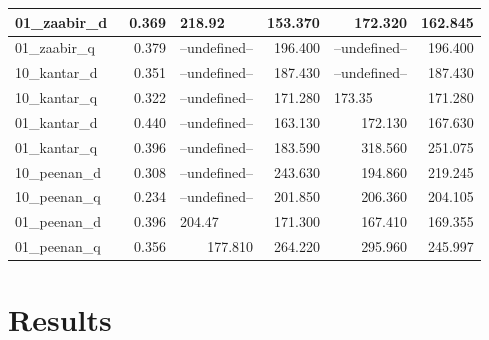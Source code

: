 \documentclass[a4paper]{article}
\begin{document}
\begin{table}[H]
\begin{tabular}{|l|r|l|r|l|r|}
\hline
01\_zaabir\_d~  & 0.369                         & 218.92                       & 153.370                            & \multicolumn{1}{r|}{172.320} & 162.845                          \\ 
\hline
01\_zaabir\_q~  & 0.379                         & --undefined--                & 196.400                            & --undefined--                & 196.400                          \\ 
\hline
10\_kantar\_d~  & 0.351                         & --undefined--                & 187.430                            & --undefined--                & 187.430                          \\ 
\hline
10\_kantar\_q~  & 0.322                         & --undefined--                & 171.280                            & 173.35                       & 171.280                          \\ 
\hline
01\_kantar\_d~  & 0.440                         & --undefined--                & 163.130                            & \multicolumn{1}{r|}{172.130} & 167.630                          \\ 
\hline
01\_kantar\_q~  & 0.396                         & --undefined--                & 183.590                            & \multicolumn{1}{r|}{318.560} & 251.075                          \\ 
\hline
10\_peenan\_d~  & 0.308                         & --undefined--                & 243.630                            & \multicolumn{1}{r|}{194.860} & 219.245                          \\ 
\hline
10\_peenan\_q~  & 0.234                         & --undefined--                & 201.850                            & \multicolumn{1}{r|}{206.360} & 204.105                          \\ 
\hline
01\_peenan\_d~  & 0.396                         & 204.47                       & 171.300                            & \multicolumn{1}{r|}{167.410} & 169.355                          \\ 
\hline
01\_peenan\_q   & 0.356                         & \multicolumn{1}{r|}{177.810} & 264.220                            & \multicolumn{1}{r|}{295.960} & 245.997                          \\
\hline
\end{tabular}
\end{table}
 
\section{Results}
\end{document}
